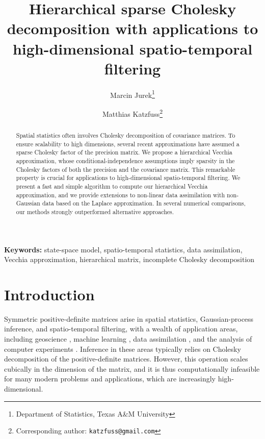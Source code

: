 \documentclass[12pt,letterpaper]{article}
\title{Hierarchical sparse Cholesky decomposition with applications to high-dimensional spatio-temporal filtering}
\author{Marcin Jurek\thanks{Department of Statistics, Texas A\&M University} \and Matthias Katzfuss\footnotemark[1] \thanks{Corresponding author: \texttt{katzfuss@gmail.com}}}
\date{}
\theoremstyle{propstyle}
\theoremstyle{propstyle}
\theoremstyle{propstyle}
\theoremstyle{propstyle}
\theoremstyle{propstyle}
\begin{document}
\maketitle

\begin{abstract}
Spatial statistics often involves Cholesky decomposition of covariance matrices. To ensure scalability to high dimensions, several recent approximations have assumed a sparse Cholesky factor of the precision matrix. We propose a hierarchical Vecchia approximation, whose conditional-independence assumptions imply sparsity in the Cholesky factors of both the precision and the covariance matrix. This remarkable property is crucial for applications to high-dimensional spatio-temporal filtering. We present a fast and simple algorithm to compute our hierarchical Vecchia approximation, and we provide extensions to non-linear data assimilation with non-Gaussian data based on the Laplace approximation. In several numerical comparisons, our methods strongly outperformed alternative approaches.
\end{abstract}

{\small\noindent\textbf{Keywords:} state-space model, spatio-temporal statistics, data assimilation, Vecchia approximation, hierarchical matrix, incomplete Cholesky decomposition}




\section{Introduction\label{sec:intro}}

Symmetric positive-definite matrices arise in spatial statistics, Gaussian-process inference, and spatio-temporal filtering, with a wealth of application areas, including geoscience \citep[e.g.,][]{Cressie1993,Banerjee2004}, machine learning \citep[e.g.,][]{Rasmussen2006}, data assimilation \citep[e.g.,][]{Nychka2010,Katzfuss2015b}, and the analysis of computer experiments \citep[e.g.,][]{Sacks1989,Kennedy2001}.
Inference in these areas typically relies on Cholesky decomposition of the positive-definite matrices. However, this operation scales cubically in the dimension of the matrix, and it is thus computationally infeasible for many modern problems and applications, which are increasingly high-dimensional.
\end{document}
